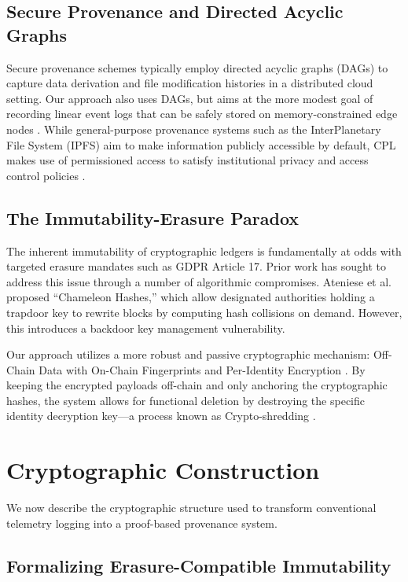 \documentclass[conference]{IEEEtran}
\begin{document}
\subsection{Secure Provenance and Directed Acyclic Graphs}
Secure provenance schemes \cite{b5} typically employ directed acyclic graphs (DAGs) to capture data derivation and file modification histories in a distributed cloud setting. Our approach also uses DAGs, but aims at the more modest goal of recording linear event logs that can be safely stored on memory-constrained edge nodes \cite{b22}. While general-purpose provenance systems such as the InterPlanetary File System (IPFS) aim to make information publicly accessible by default, CPL makes use of permissioned access to satisfy institutional privacy and access control policies \cite{b7}.

\subsection{The Immutability-Erasure Paradox}
The inherent immutability of cryptographic ledgers is fundamentally at odds with targeted erasure mandates such as GDPR Article 17. Prior work has sought to address this issue through a number of algorithmic compromises. Ateniese et al. \cite{b10} proposed ``Chameleon Hashes,'' which allow designated authorities holding a trapdoor key to rewrite blocks by computing hash collisions on demand. However, this introduces a backdoor key management vulnerability.

Our approach utilizes a more robust and passive cryptographic mechanism: Off-Chain Data with On-Chain Fingerprints and Per-Identity Encryption \cite{b20}. By keeping the encrypted payloads off-chain and only anchoring the cryptographic hashes, the system allows for functional deletion by destroying the specific identity decryption key---a process known as Crypto-shredding \cite{b8}.

\section{Cryptographic Construction}

We now describe the cryptographic structure used to transform conventional telemetry logging into a proof-based provenance system.

\subsection{Formalizing Erasure-Compatible Immutability}
\end{document}
